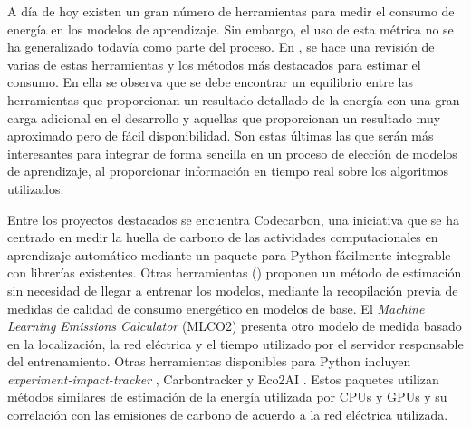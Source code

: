 A día de hoy existen un gran número de herramientas para medir el consumo de energía en los modelos de aprendizaje. Sin embargo, el uso de esta métrica no se ha generalizado todavía como parte del proceso. En \cite{eva2019review}, se hace una revisión de varias de estas herramientas y los métodos más destacados para estimar el consumo. En ella se observa que se debe encontrar un equilibrio entre las herramientas que proporcionan un resultado detallado de la energía con una gran carga adicional en el desarrollo y aquellas que proporcionan un resultado muy aproximado pero de fácil disponibilidad. Son estas últimas las que serán más interesantes para integrar de forma sencilla en un proceso de elección de modelos de aprendizaje, al proporcionar información en tiempo real sobre los algoritmos utilizados.



Entre los proyectos destacados se encuentra Codecarbon\cite{codecarbon}, una iniciativa que se ha centrado en medir la huella de carbono de las actividades computacionales en aprendizaje automático mediante un paquete para Python fácilmente integrable con librerías existentes. Otras herramientas (\cite{getzner2023accuracy}) proponen un método de estimación sin necesidad de llegar a entrenar los modelos, mediante la recopilación previa de medidas de calidad de consumo energético en modelos de base. El \emph{Machine Learning Emissions Calculator} (MLCO2)\cite{lacoste2019mlco2} presenta otro modelo de medida basado en la localización, la red eléctrica y el tiempo utilizado por el servidor responsable del entrenamiento. Otras herramientas disponibles para Python incluyen \emph{experiment-impact-tracker} \cite{henderson2020tracker}, Carbontracker \cite{anthony2020carbontracker} y Eco2AI \cite{budennyy2022eco2ai}. Estos paquetes utilizan métodos similares de estimación de la energía utilizada por CPUs y GPUs y su correlación con las emisiones de carbono de acuerdo a la red eléctrica utilizada.

